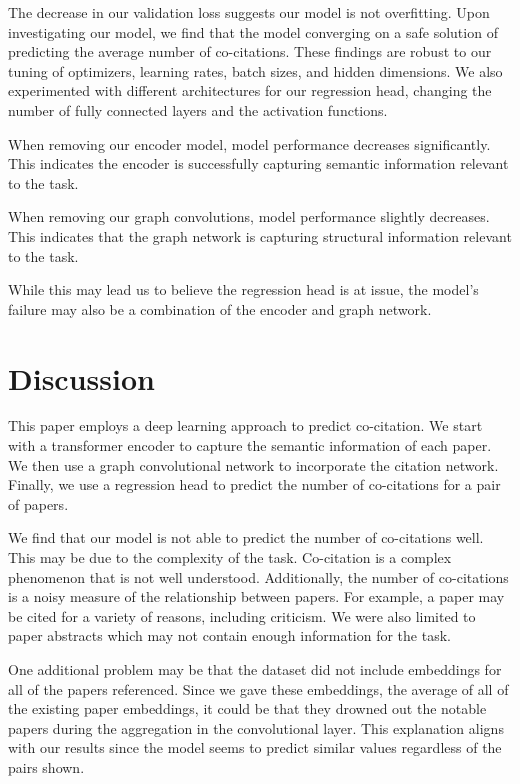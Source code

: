 \documentclass[10pt,twocolumn,letterpaper]{article}
\begin{document}
The decrease in our validation loss suggests our model is not overfitting. Upon investigating our model, we find that the model converging on a safe solution of predicting the average number of co-citations. These findings are robust to our tuning of optimizers, learning rates, batch sizes, and hidden dimensions. We also experimented with different architectures for our regression head, changing the number of fully connected layers and the activation functions. 

When removing our encoder model, model performance decreases significantly. This indicates the encoder is successfully capturing semantic information relevant to the task. 

When removing our graph convolutions, model performance slightly decreases. This indicates that the graph network is capturing structural information relevant to the task. 

While this may lead us to believe the regression head is at issue, the model's failure may also be a combination of the encoder and graph network. 


\section{Discussion}

This paper employs a deep learning approach to predict co-citation. We start with a transformer encoder to capture the semantic information of each paper. We then use a graph convolutional network to incorporate the citation network. Finally, we use a regression head to predict the number of co-citations for a pair of papers. 

We find that our model is not able to predict the number of co-citations well. This may be due to the complexity of the task. Co-citation is a complex phenomenon that is not well understood. Additionally, the number of co-citations is a noisy measure of the relationship between papers. For example, a paper may be cited for a variety of reasons, including criticism. We were also limited to paper abstracts which may not contain enough information for the task. 

One additional problem may be that the dataset did not include embeddings for all of the papers referenced. Since we gave these embeddings, the average of all of the existing paper embeddings, it could be that they drowned out the notable papers during the aggregation in the convolutional layer. This explanation aligns with our results since the model seems to predict similar values regardless of the pairs shown. 
\end{document}
